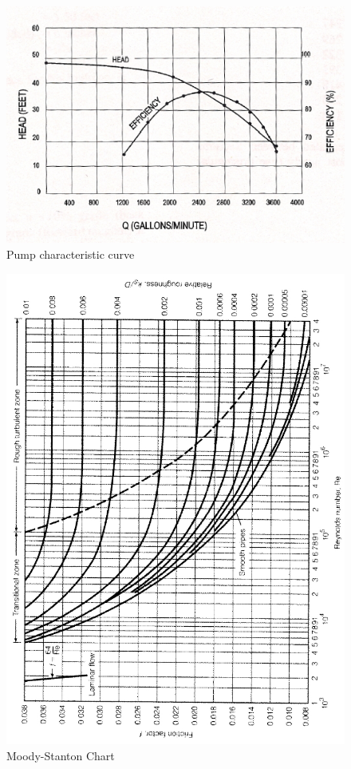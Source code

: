 \documentclass[12pt]{article}
\begin{document}
\begin{enumerate}
\begin{figure}[h!] %
\centering
   \includegraphics[width=4.5in]{PumpCurve.jpg}
   \caption{Pump characteristic curve}
   \label{fig:PumpCurve} 
\end{figure}

\clearpage
\begin{figure}[h!] %
\centering
   \includegraphics[width=5.5in]{Moody1.jpg}
   \caption{Moody-Stanton Chart}
   \label{fig:moody} 
\end{figure}
\clearpage


\end{enumerate}
\end{document}
